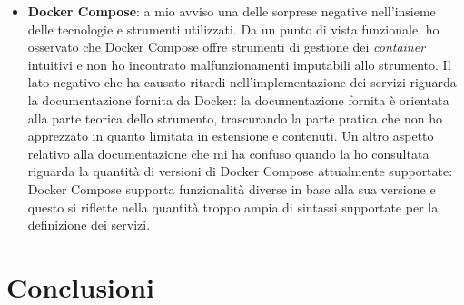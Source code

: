 \begin{itemize}
  \item \textbf{Docker Compose}: a mio avviso una delle sorprese negative nell'insieme delle tecnologie e strumenti utilizzati. Da un punto di vista funzionale, ho osservato che Docker Compose offre strumenti di gestione dei \emph{container} intuitivi e non ho incontrato malfunzionamenti imputabili allo strumento. Il lato negativo che ha causato ritardi nell'implementazione dei servizi riguarda la documentazione fornita da Docker: la documentazione fornita è orientata alla parte teorica dello strumento, trascurando la parte pratica che non ho apprezzato in quanto limitata in estensione e contenuti. Un altro aspetto relativo alla documentazione che mi ha confuso quando la ho consultata riguarda la quantità di versioni di Docker Compose attualmente supportate: Docker Compose supporta funzionalità diverse in base alla sua versione e questo si riflette nella quantità troppo ampia di sintassi supportate per la definizione dei servizi.
\end{itemize}



\section{Conclusioni}

